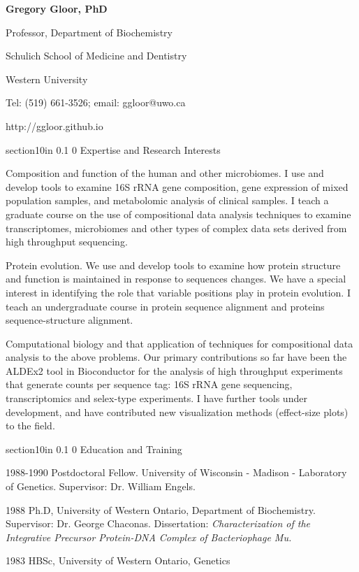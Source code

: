 \documentclass[11pt]{article}
\makeatletter
\renewcommand\section{\@startsection
	{section}{1}{0in}%
	{0.1\baselineskip}%
	{0\baselineskip}%
	{\sffamily\bfseries\large}
}
\makeatother
\begin{document}
\begin{center}
\textbf{Gregory Gloor, PhD}

Professor, Department of Biochemistry

Schulich School of Medicine and Dentistry

Western University

Tel: (519) 661-3526; email: ggloor@uwo.ca 
 
http://ggloor.github.io
\end{center}
\section{Expertise and Research Interests}
\begin{description}\itemsep=2pt
\item Composition and function of the human and other microbiomes. I use and develop tools to examine 16S rRNA gene composition, gene expression of mixed population samples, and metabolomic analysis of clinical samples. I teach a graduate course on the use of compositional data analysis techniques to examine transcriptomes, microbiomes and other types of complex data sets derived from high throughput sequencing. 
\item Protein evolution. We use and develop tools to examine how protein structure and function is maintained in response to sequences changes. We have a special interest in identifying the role that variable positions play in protein evolution. I teach an undergraduate course in protein sequence alignment and proteins sequence-structure alignment. 
\item Computational biology and that application of techniques for compositional data analysis to the above problems. Our primary contributions so far have been the ALDEx2 tool in Bioconductor for the analysis of high throughput experiments that generate counts per sequence tag: 16S rRNA gene sequencing, transcriptomics and selex-type experiments. I have further tools under development, and have contributed new visualization methods (effect-size plots) to the field.
\end{description}

\section{Education and Training}
\begin{description}\itemsep=2pt
\item 1988-1990  Postdoctoral Fellow.  University of Wisconsin - Madison - Laboratory of Genetics. Supervisor: Dr. William Engels.
\item 1988  Ph.D, University of Western Ontario, Department of Biochemistry. Supervisor: Dr. George Chaconas. Dissertation: \textit{Characterization of the Integrative Precursor  Protein-DNA Complex of Bacteriophage Mu.}
\item 1983  HBSc, University of Western Ontario, Genetics
\end{description}
\end{document}
